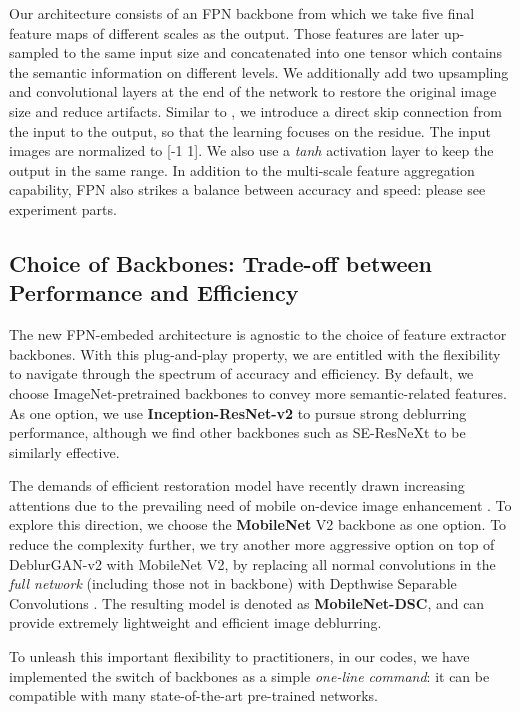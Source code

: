 \documentclass[10pt,twocolumn,letterpaper]{article}
\begin{document}
Our architecture consists of an FPN backbone from which we take five final feature maps of different scales as the output. Those features are later up-sampled to the same  input size and concatenated into one tensor which contains the semantic information on different levels. We additionally add two upsampling and convolutional layers at the end of the network to restore the original image size  and reduce artifacts. Similar to \cite{kupyn2018deblurgan,liu2018image}, we introduce a direct skip connection from the input to the output, so that the learning focuses on the residue. The input images are normalized to [-1 1]. We also use a \textit{tanh} activation layer to keep the output in the same range. In addition to the multi-scale feature aggregation capability, FPN also strikes a balance between accuracy and speed: please see experiment parts. 


\vspace{-0.2em}
\subsection{Choice of Backbones: Trade-off between Performance and Efficiency}
\vspace{-0.5em}
The new FPN-embeded architecture is agnostic to the choice of feature extractor backbones. With this plug-and-play property, we are entitled with the flexibility to navigate through the spectrum of accuracy and efficiency. By default, we choose ImageNet-pretrained backbones to convey more semantic-related features. As one option, we use \textbf{Inception-ResNet-v2} \cite{szegedy2017inception} to pursue strong deblurring performance, although we find other backbones such as SE-ResNeXt \cite{hu2018squeeze} to be similarly effective. 

The demands of efficient restoration model have recently drawn increasing attentions due to the prevailing need of mobile on-device image enhancement \cite{yu2018crafting,wu2018deep,wang2018energynet}. To explore this direction, we choose the \textbf{MobileNet} V2 backbone \cite{MobileNet} as one option. To reduce the complexity further, we try another more aggressive option on top of DeblurGAN-v2 with MobileNet V2, by replacing all normal convolutions in the \textit{full network} (including those not in backbone) with Depthwise Separable Convolutions \cite{chollet2017xception}. The resulting model is denoted as \textbf{MobileNet-DSC}, and can provide extremely lightweight and efficient image deblurring.

To unleash this important flexibility to practitioners, in our codes, we have implemented the switch of backbones as a simple \textit{one-line command}: it can be compatible with many state-of-the-art pre-trained networks. 
\end{document}
